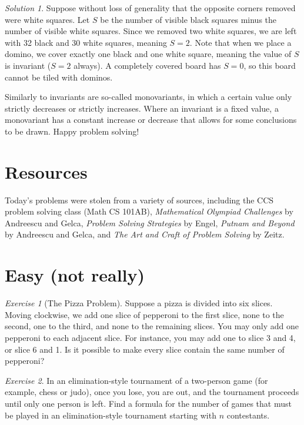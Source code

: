 \documentclass{article}
\theoremstyle{definition}
\theoremstyle{remark}
\newtheorem{exercise}{Exercise}
\newtheorem*{solution}{Solution}
\begin{document}
    \begin{solution}
        Suppose without loss of generality that the opposite corners removed were white squares. Let \(S\) be the number of visible black squares minus the number of visible white squares. Since we removed two white squares, we are left with 32 black and 30 white squares, meaning \(S=2\). Note that when we place a domino, we cover exactly one black and one white square, meaning the value of \(S\) is invariant (\(S=2\) always). A completely covered board has \(S=0\), so this board cannot be tiled with dominos.
    \end{solution}

    Similarly to invariants are so-called monovariants, in which a certain value only strictly decreases or strictly increases. Where an invariant is a fixed value, a monovariant has a constant increase or decrease that allows for some conclusions to be drawn. Happy problem solving!

\section{Resources}

    Today's problems were stolen from a variety of sources, including the CCS problem solving class (Math CS 101AB), \textit{Mathematical Olympiad Challenges} by Andreescu and Gelca, \textit{Problem Solving Strategies} by Engel, \textit{Putnam and Beyond} by Andreescu and Gelca, and \textit{The Art and Craft of Problem Solving} by Zeitz.

\section{Easy (not really)}

    \begin{exercise}[The Pizza Problem]
        Suppose a pizza is divided into six slices. Moving clockwise, we add one slice of pepperoni to the first slice, none to the second, one to the third, and none to the remaining slices. You may only add one pepperoni to each adjacent slice. For instance, you may add one to slice 3 and 4, or slice 6 and 1. Is it possible to make every slice contain the same number of pepperoni?
    \end{exercise}

    \begin{exercise}
        In an elimination-style tournament of a two-person game (for example, chess or judo), once you lose, you are out, and the tournament proceeds until only one person is left. Find a formula for the number of games that must be played in an elimination-style tournament starting with \(n\) contestants.
    \end{exercise}
\end{document}
